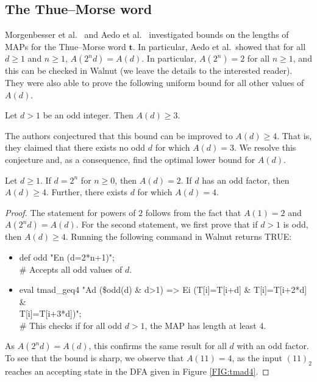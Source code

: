 \documentclass[10pt,a4paper,reqno]{amsart}
\newcommand{\bft}{{\mathbf t}}
\newcommand{\mc}{\mathcal}
\newcommand{\T}{\mc T}
\newcommand{\walnut}{{\ttfamily Walnut}}
\begin{document}
\subsection{The Thue--Morse word}\label{misc}
Morgenbesser et al.\ \cite{mss2011} and Aedo et al.\ \cite{aedo2022} investigated bounds on the lengths of MAPs for the Thue--Morse word $\bft$. In particular, Aedo et al.\ showed that for all $d \geq 1$ and $n \geq 1$, $A(2^nd) = A(d)$. In particular, $A(2^n)=2$ for all $n \geq 1$, and this can be checked in \walnut{} (we leave the details to the interested reader). They were also able to prove the following uniform bound for all other values of $A(d)$. 
\begin{lem}\label{LEM:tmadgeq3}
Let $d > 1$ be an odd integer. Then $A(d)\geq 3$.
\end{lem}
The authors conjectured that this bound can be improved to $A(d)\geq 4$. That is, they claimed that there exists no odd $d$ for which $A(d)=3$. We resolve this conjecture and, as a consequence, find the optimal lower bound for $A(d)$.
\begin{prop}\label{tmadnot3}
Let $d\geq 1$.
If $d=2^n$ for $n \geq 0$, then $A(d)=2$.
If $d$ has an odd factor, then $A(d)\geq 4$. Further, there exists $d$ for which $A(d)=4$.
\end{prop}
\begin{proof}
The statement for powers of $2$ follows from the fact that $A(1)=2$ and $A(2^nd)=A(d)$.
For the second statement, we first prove that if $d>1$ is odd, then $A(d)\geq 4$. Running the following command in \walnut{} returns {\ttfamily TRUE}:
\begin{itemize}
    \item {\ttfamily def odd "En (d=2*n+1)";\\ \# Accepts all odd values of $d$.}
    \item {\ttfamily eval tmad\_geq4 "Ad (\$odd(d) \& d>1) => Ei (T[i]=T[i+d] \& T[i]=T[i+2*d] \& \\T[i]=T[i+3*d])";\\\# This checks if for all odd $d>1$, the MAP has length at least $4$.}
    \end{itemize}
    As $A(2^nd)=A(d)$, this confirms the same result for all $d$ with an odd factor.
To see that the bound is sharp, we observe that $A(11)=4$, as the input $(11)_2$ reaches an accepting state in the DFA given in Figure \ref{FIG:tmad4}.
\end{proof}
\end{document}
